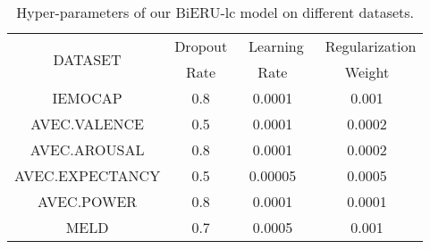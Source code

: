 \documentclass[journal]{IEEEtran}
\begin{document}
\begin{table}[!htb]
    \centering
    \begin{tabular}{|c|c|c|c|}
        \hline
        \multirow{2}{*}{DATASET} & Dropout & \ Learning & \ Regularization \\
        & Rate & Rate & Weight\\
        \hline
        \hline
        IEMOCAP & 0.8 & 0.0001 & 0.001 \\
        \hline
        AVEC.VALENCE & 0.5 & 0.0001 & 0.0002 \\
        AVEC.AROUSAL & 0.8 & 0.0001 & 0.0002  \\
        AVEC.EXPECTANCY & 0.5 & 0.00005 & 0.0005  \\
        AVEC.POWER & 0.8 & 0.0001 & 0.0001  \\
        \hline
        MELD & 0.7 & 0.0005 & 0.001 \\
        \hline
    \end{tabular}
\caption{Hyper-parameters of our BiERU-lc model on different datasets.}
    \label{tab:param}
\end{table}{}
\end{document}
